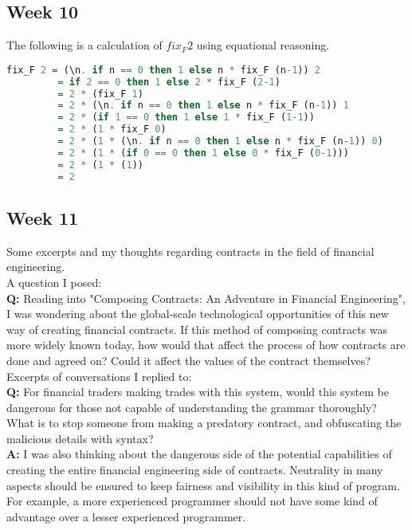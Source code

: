 \documentclass{article}
\theoremstyle{theorem}
\theoremstyle{definition}
\theoremstyle{remark}
\begin{document}
\subsection{Week 10}
The following is a calculation of $fix_F 2$ using equational reasoning.

\begin{lstlisting}[language=Haskell]
fix_F 2 = (\n. if n == 0 then 1 else n * fix_F (n-1)) 2
         = if 2 == 0 then 1 else 2 * fix_F (2-1)
         = 2 * (fix_F 1)
         = 2 * (\n. if n == 0 then 1 else n * fix_F (n-1)) 1
         = 2 * (if 1 == 0 then 1 else 1 * fix_F (1-1))
         = 2 * (1 * fix_F 0)
         = 2 * (1 * (\n. if n == 0 then 1 else n * fix_F (n-1)) 0)
         = 2 * (1 * (if 0 == 0 then 1 else 0 * fix_F (0-1)))
         = 2 * (1 * (1))
         = 2
\end{lstlisting}
\newpage

\subsection{Week 11}
Some excerpts and my thoughts regarding contracts in the field of financial engineering.\\

\noindent A question I posed:\\

\textbf{Q:} Reading into "Composing Contracts: An Adventure in Financial Engineering", I was wondering about the global-scale technological opportunities of this new way of creating financial contracts. If this method of composing contracts was more widely known today, how would that affect the process of how contracts are done and agreed on? Could it affect the values of the contract themselves?\\

\noindent Excerpts of conversations I replied to:\\

\textbf{Q:} For financial traders making trades with this system, would this system be dangerous for those not capable of understanding the grammar thoroughly? What is to stop someone from making a predatory contract, and obfuscating the malicious details with syntax?\\

\textbf{A:} I was also thinking about the dangerous side of the potential capabilities of creating the entire financial engineering side of contracts. Neutrality in many aspects should be ensured to keep fairness and visibility in this kind of program. For example, a more experienced programmer should not have some kind of advantage over a lesser experienced programmer.\\
\end{document}
